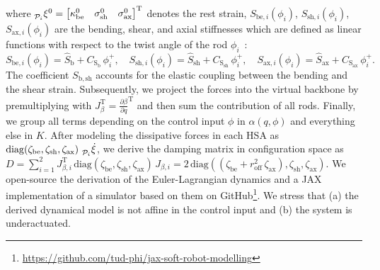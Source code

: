 where $\prescript{}{\mathcal{P}_i}{\xi}^0 = \begin{bmatrix}\kappa_\mathrm{be}^0 & \sigma_\mathrm{sh}^0 & \sigma_\mathrm{ax}^0\end{bmatrix}^\mathrm{T}$ denotes the rest strain,
$S_{\mathrm{be},i}(\phi_i)$, $S_{\mathrm{sh},i}(\phi_i)$, $S_{\mathrm{ax},i}(\phi_i)$ are the bending, shear, and axial stiffnesses which are defined as linear functions with respect to the twist angle of the rod $\phi_i$~\cite{good2022expanding, stolzle2023modelling}:
\begin{equation}
    S_{\mathrm{be},i}(\phi_i) = \hat{S}_{\mathrm{b}} + C_{\mathrm{S}_\mathrm{b}} \, \phi_{i}^+,
    \quad
    S_{\mathrm{sh},i}(\phi_i) = \hat{S}_{\mathrm{sh}} + C_{\mathrm{S}_\mathrm{sh}} \, \phi_{i}^+,
    \quad 
    S_{\mathrm{ax},i}(\phi_i) = \hat{S}_{\mathrm{ax}} + C_{\mathrm{S}_\mathrm{ax}} \, \phi_{i}^+.
\end{equation}
The coefficient $S_{\mathrm{b},\mathrm{sh}}$ accounts for the elastic coupling between the bending and the shear strain. 
Subsequently, we project the forces into the virtual backbone by premultiplying with $J_\beta^\mathrm{T} = \frac{\partial \beta}{\partial q}^\mathrm{T}$ and then sum the contribution of all rods.
Finally, we group all terms depending on the control input $\phi$ in $\alpha(q,\phi)$ and everything else in $K$.
After modeling the dissipative forces in each \gls{HSA} as $\mathrm{diag}(\zeta_\mathrm{be}, \zeta_{\mathrm{sh}}, \zeta_{\mathrm{ax}}) \, \prescript{}{\mathcal{P}_i}{\dot{\xi}}$, we derive the damping matrix in configuration space as $D = \sum_{i=1}^{2} J_{\beta,i}^\mathrm{T} \, \mathrm{diag}(\zeta_\mathrm{be}, \zeta_{\mathrm{sh}}, \zeta_{\mathrm{ax}}) \, J_{\beta,i} = 2 \, \mathrm{diag}\left ( (\zeta_\mathrm{be} + r_\mathrm{off}^2 \, \zeta_\mathrm{ax} ), \zeta_{\mathrm{sh}}, \zeta_{\mathrm{ax}} \right)$.
We open-source the derivation of the Euler-Lagrangian dynamics and a JAX implementation of a simulator based on them on GitHub\footnote{\url{https://github.com/tud-phi/jax-soft-robot-modelling}}.
We stress that (a) the derived dynamical model is not affine in the control input and (b) the system is underactuated.

